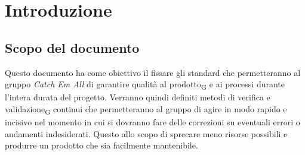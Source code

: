 \section{Introduzione}

\subsection{Scopo del documento}
Questo documento ha come obiettivo il fissare gli standard che permetteranno al gruppo \textit{Catch Em All} di garantire qualità al prodotto\textsubscript{G} e ai processi durante l'intera durata del progetto. Verranno quindi definiti metodi di verifica e validazione\textsubscript{G} continui che permetteranno al gruppo di agire in modo rapido e incisivo nel momento in cui si dovranno fare delle correzioni su eventuali errori o andamenti indesiderati. Questo allo scopo di sprecare meno risorse possibili e produrre un prodotto che sia facilmente mantenibile. 

